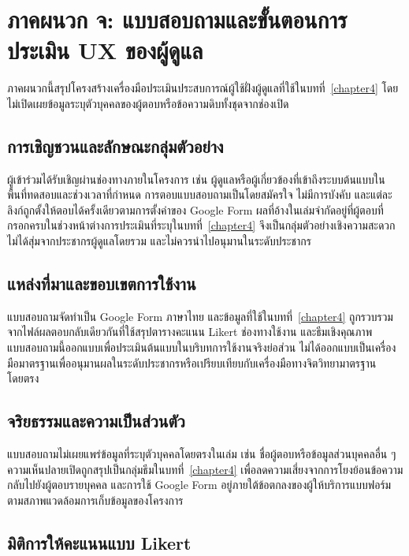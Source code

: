 \chapter{ภาคผนวก จ: แบบสอบถามและขั้นตอนการประเมิน UX ของผู้ดูแล}
\label{app:ux_instrument}

ภาคผนวกนี้สรุปโครงสร้างเครื่องมือประเมินประสบการณ์ผู้ใช้ฝั่งผู้ดูแลที่ใช้ในบทที่~\ref{chapter4} โดยไม่เปิดเผยข้อมูลระบุตัวบุคคลของผู้ตอบหรือข้อความดิบทั้งชุดจากช่องเปิด

\section*{การเชิญชวนและลักษณะกลุ่มตัวอย่าง}

ผู้เข้าร่วมได้รับเชิญผ่านช่องทางภายในโครงการ เช่น ผู้ดูแลหรือผู้เกี่ยวข้องที่เข้าถึงระบบต้นแบบในพื้นที่ทดสอบและช่วงเวลาที่กำหนด การตอบแบบสอบถามเป็นโดยสมัครใจ ไม่มีการบังคับ และแต่ละลิงก์ถูกตั้งให้ตอบได้ครั้งเดียวตามการตั้งค่าของ Google Form ผลที่อ้างในเล่มจำกัดอยู่ที่ผู้ตอบที่กรอกครบในช่วงหน้าต่างการประเมินที่ระบุในบทที่~\ref{chapter4} จึงเป็นกลุ่มตัวอย่างเชิงความสะดวก ไม่ได้สุ่มจากประชากรผู้ดูแลโดยรวม และไม่ควรนำไปอนุมานในระดับประชากร

\section*{แหล่งที่มาและขอบเขตการใช้งาน}

แบบสอบถามจัดทำเป็น Google Form ภาษาไทย และข้อมูลที่ใช้ในบทที่~\ref{chapter4} ถูกรวบรวมจากไฟล์ผลตอบกลับเดียวกันที่ใช้สรุปตารางคะแนน Likert ช่องทางใช้งาน และธีมเชิงคุณภาพ แบบสอบถามนี้ออกแบบเพื่อประเมินต้นแบบในบริบทการใช้งานจริงย่อส่วน ไม่ได้ออกแบบเป็นเครื่องมือมาตรฐานเพื่ออนุมานผลในระดับประชากรหรือเปรียบเทียบกับเครื่องมือทางจิตวิทยามาตรฐานโดยตรง

\section*{จริยธรรมและความเป็นส่วนตัว}

แบบสอบถามไม่เผยแพร่ข้อมูลที่ระบุตัวบุคคลโดยตรงในเล่ม เช่น ชื่อผู้ตอบหรือข้อมูลส่วนบุคคลอื่น ๆ ความเห็นปลายเปิดถูกสรุปเป็นกลุ่มธีมในบทที่~\ref{chapter4} เพื่อลดความเสี่ยงจากการโยงย้อนข้อความกลับไปยังผู้ตอบรายบุคคล และการใช้ Google Form อยู่ภายใต้ข้อตกลงของผู้ให้บริการแบบฟอร์มตามสภาพแวดล้อมการเก็บข้อมูลของโครงการ

\section*{มิติการให้คะแนนแบบ Likert}

